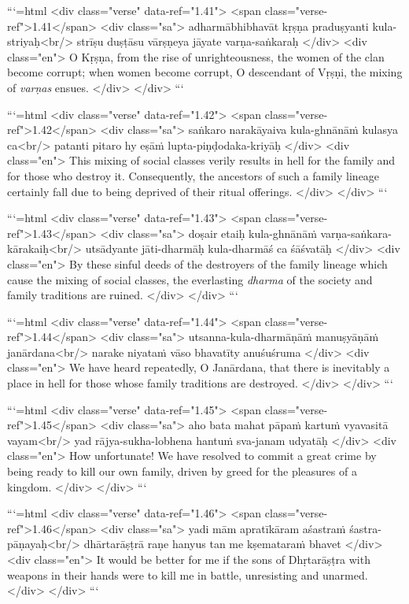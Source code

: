 ```{=html}
<div class="verse" data-ref="1.41">
  <span class="verse-ref">1.41</span>
  <div class="sa">
    adharmābhibhavāt kṛṣṇa praduṣyanti kula-striyaḥ<br/>
    strīṣu duṣṭāsu vārṣṇeya jāyate varṇa-saṅkaraḥ
  </div>
  <div class="en">
    O Kṛṣṇa, from the rise of unrighteousness, the women of the clan become corrupt; when women become corrupt, O descendant of Vṛṣṇi, the mixing of \textit{varṇas} ensues.
  </div>
</div>
```



```{=html}
<div class="verse" data-ref="1.42">
  <span class="verse-ref">1.42</span>
  <div class="sa">
    saṅkaro narakāyaiva kula-ghnānāṁ kulasya ca<br/>
    patanti pitaro hy eṣāṁ lupta-piṇḍodaka-kriyāḥ
  </div>
  <div class="en">
    This mixing of social classes verily results in hell for the family and for those who destroy it. Consequently, the ancestors of such a family lineage certainly fall due to being deprived of their ritual offerings.
  </div>
</div>
```



```{=html}
<div class="verse" data-ref="1.43">
  <span class="verse-ref">1.43</span>
  <div class="sa">
    doṣair etaiḥ kula-ghnānāṁ varṇa-saṅkara-kārakaiḥ<br/>
    utsādyante jāti-dharmāḥ kula-dharmāś ca śāśvatāḥ
  </div>
  <div class="en">
    By these sinful deeds of the destroyers of the family lineage which cause the mixing of social classes, the everlasting \textit{dharma} of the society and family traditions are ruined.
  </div>
</div>
```



```{=html}
<div class="verse" data-ref="1.44">
  <span class="verse-ref">1.44</span>
  <div class="sa">
    utsanna-kula-dharmāṇāṁ manuṣyāṇāṁ janārdana<br/>
    narake niyataṁ vāso bhavatīty anuśuśruma
  </div>
  <div class="en">
    We have heard repeatedly, O Janārdana, that there is inevitably a place in hell for those whose family traditions are destroyed.
  </div>
</div>
```



```{=html}
<div class="verse" data-ref="1.45">
  <span class="verse-ref">1.45</span>
  <div class="sa">
    aho bata mahat pāpaṁ kartuṁ vyavasitā vayam<br/>
    yad rājya-sukha-lobhena hantuṁ sva-janam udyatāḥ
  </div>
  <div class="en">
    How unfortunate! We have resolved to commit a great crime by being ready to kill our own family, driven by greed for the pleasures of a kingdom.
  </div>
</div>
```



```{=html}
<div class="verse" data-ref="1.46">
  <span class="verse-ref">1.46</span>
  <div class="sa">
    yadi mām apratīkāram aśastraṁ śastra-pāṇayaḥ<br/>
    dhārtarāṣṭrā raṇe hanyus tan me kṣemataraṁ bhavet
  </div>
  <div class="en">
    It would be better for me if the sons of Dhṛtarāṣṭra with weapons in their hands were to kill me in battle, unresisting and unarmed.
  </div>
</div>
```




